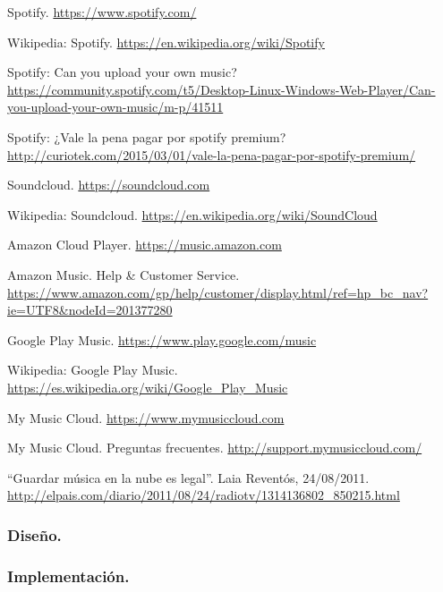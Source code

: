  Spotify. \url{https://www.spotify.com/}

 Wikipedia: Spotify. \url{https://en.wikipedia.org/wiki/Spotify}

 Spotify: Can you upload your own music? \url{https://community.spotify.com/t5/Desktop-Linux-Windows-Web-Player/Can-you-upload-your-own-music/m-p/41511}

 Spotify: ¿Vale la pena pagar por spotify premium? \url{http://curiotek.com/2015/03/01/vale-la-pena-pagar-por-spotify-premium/}

 Soundcloud. \url{https://soundcloud.com}

 Wikipedia: Soundcloud. \url{https://en.wikipedia.org/wiki/SoundCloud}

 Amazon Cloud Player. \url{https://music.amazon.com}

 Amazon Music. Help \& Customer Service. \url{https://www.amazon.com/gp/help/customer/display.html/ref=hp_bc_nav?ie=UTF8&nodeId=201377280}

 Google Play Music. \url{https://www.play.google.com/music}

 Wikipedia: Google Play Music. \url{https://es.wikipedia.org/wiki/Google_Play_Music}

 My Music Cloud. \url{https://www.mymusiccloud.com}

 My Music Cloud. Preguntas frecuentes. \url{http://support.mymusiccloud.com/}

 ``Guardar música en la nube es legal''. Laia Reventós, 24/08/2011. \url{http://elpais.com/diario/2011/08/24/radiotv/1314136802_850215.html}

\subsubsection*{Diseño.}

\subsubsection*{Implementación.}

